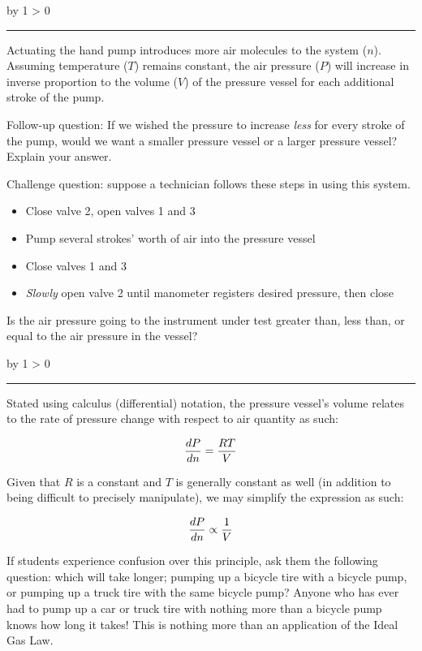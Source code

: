 \documentclass[12pt,a4paper]{article}
\def\svar{
           \advance\answnum by 1
           \ifnum \answnum > 0
                \hrule
                \vskip 3pt
                \leftline{Svar \the\answnum}
                \vskip 3pt \fi}
\def\notes{
           \advance\explnum by 1
           \ifnum \explnum > 0
                \hrule
                \vskip 3pt
                \leftline{Notes \the\explnum}
                \vskip 3pt \fi}
\begin{document}
\vskip 10pt \filbreak 





\svar{} 

Actuating the hand pump introduces more air molecules to the system ($n$).  Assuming temperature ($T$) remains constant, the air pressure ($P$) will increase in inverse proportion to the volume ($V$) of the pressure vessel for each additional stroke of the pump.

\vskip 10pt

Follow-up question: If we wished the pressure to increase {\it less} for every stroke of the pump, would we want a smaller pressure vessel or a larger pressure vessel?  Explain your answer.

\vskip 10pt

Challenge question: suppose a technician follows these steps in using this system.

\begin{itemize}
\item{} Close valve 2, open valves 1 and 3
\item{} Pump several strokes' worth of air into the pressure vessel
\item{} Close valves 1 and 3
\item{} {\it Slowly} open valve 2 until manometer registers desired pressure, then close
\end{itemize}

Is the air pressure going to the instrument under test greater than, less than, or equal to the air pressure in the vessel?

\vskip 10pt \filbreak 





\notes{} 

Stated using calculus (differential) notation, the pressure vessel's volume relates to the rate of pressure change with respect to air quantity as such:

$${dP \over dn} = {RT \over V}$$

Given that $R$ is a constant and $T$ is generally constant as well (in addition to being difficult to precisely manipulate), we may simplify the expression as such:

$${dP \over dn} \propto {1 \over V}$$

If students experience confusion over this principle, ask them the following question: which will take longer; pumping up a bicycle tire with a bicycle pump, or pumping up a truck tire with the same bicycle pump?  Anyone who has ever had to pump up a car or truck tire with nothing more than a bicycle pump knows how long it takes!  This is nothing more than an application of the Ideal Gas Law.
\end{document}
